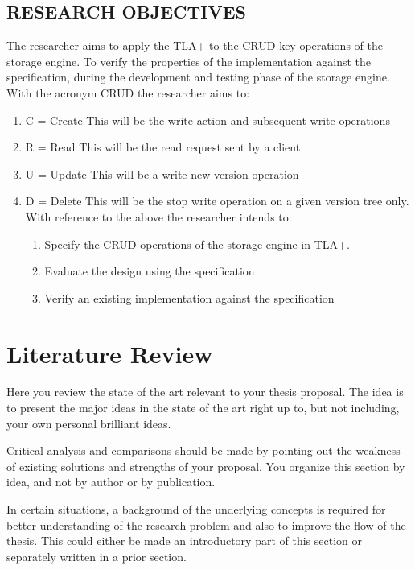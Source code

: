 \documentclass[11pt,a4paper,oneside]{book} %
\numberwithin{equation}{section}
\begin{document}
\section{RESEARCH OBJECTIVES}
The researcher aims to apply the TLA+ to the CRUD key operations of the storage engine. To
verify the properties of the implementation against the specification, during the development
and testing phase of the storage engine.
With the acronym CRUD the researcher aims to:
\begin{enumerate}

\item C = Create
This will be the write action and subsequent write operations
\item R = Read
This will be the read request sent by a client
\item U = Update
This will be a write new version operation
\item D = Delete
This will be the stop write operation on a given version tree only.
With reference to the above the researcher intends to:
\begin{enumerate}
\item Specify the CRUD operations of the storage engine in TLA+.
\item Evaluate the design using the specification
\item Verify an existing implementation against the specification
\end{enumerate}
\end{enumerate}





\chapter{Literature Review}\label{c-review}
Here you review the state of the art relevant to your thesis proposal. The idea is to present the major ideas in the state of the art right up to, but not including, your own personal brilliant ideas.

Critical analysis and comparisons should be made by pointing out the weakness of existing solutions and strengths of your proposal. You organize this section by idea, and not by author or by publication.

In certain situations, a background of the underlying concepts is required for better understanding of the research problem and also to improve the flow of the thesis. This could either be made an introductory part of this section or separately written in a prior section.
\end{document}
